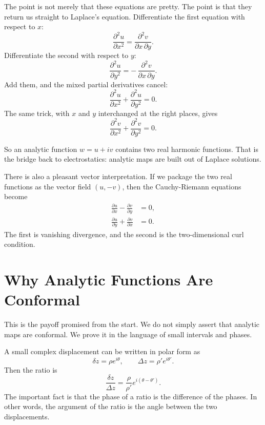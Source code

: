 The point is not merely that these equations are pretty. The point is that they return us straight to Laplace's equation. Differentiate the first equation with respect to \(x\):
\begin{equation}
\frac{\partial^2 u}{\partial x^2}=\frac{\partial^2 v}{\partial x\,\partial y}.
\end{equation}
Differentiate the second with respect to \(y\):
\begin{equation}
\frac{\partial^2 u}{\partial y^2}=-\,\frac{\partial^2 v}{\partial x\,\partial y}.
\end{equation}
Add them, and the mixed partial derivatives cancel:
\begin{equation}
\frac{\partial^2 u}{\partial x^2}+\frac{\partial^2 u}{\partial y^2}=0.
\end{equation}
The same trick, with \(x\) and \(y\) interchanged at the right places, gives
\begin{equation}
\frac{\partial^2 v}{\partial x^2}+\frac{\partial^2 v}{\partial y^2}=0.
\end{equation}

So an analytic function \(w=u+iv\) contains two real harmonic functions. That is the bridge back to electrostatics: analytic maps are built out of Laplace solutions.

There is also a pleasant vector interpretation. If we package the two real functions as the vector field \((u,-v)\), then the Cauchy-Riemann equations become
\begin{align}
\frac{\partial u}{\partial x}-\frac{\partial v}{\partial y} &= 0, \\
\frac{\partial u}{\partial y}+\frac{\partial v}{\partial x} &= 0.
\end{align}
The first is vanishing divergence, and the second is the two-dimensional curl condition.

\section{Why Analytic Functions Are Conformal}

This is the payoff promised from the start. We do not simply assert that analytic maps are conformal. We prove it in the language of small intervals and phases.

A small complex displacement can be written in polar form as
\begin{equation}
\delta z=\rho e^{i\theta}, \qquad \Delta z=\rho' e^{i\theta'}.
\end{equation}
Then the ratio is
\begin{equation}
\frac{\delta z}{\Delta z}=\frac{\rho}{\rho'}e^{i(\theta-\theta')}.
\end{equation}
The important fact is that the phase of a ratio is the difference of the phases. In other words, the argument of the ratio is the angle between the two displacements.

